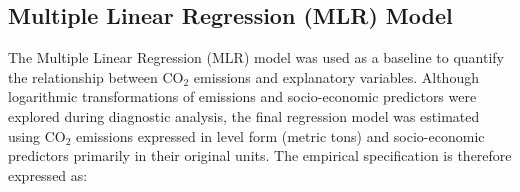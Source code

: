 \documentclass[10pt,letterpaper]{article}
\begin{document}
%
%




\subsection{Multiple Linear Regression (MLR) Model}
\label{sec:mlr_model}


The Multiple Linear Regression (MLR) model was used as a baseline to quantify the relationship between CO$_2$ emissions and explanatory variables\cite{shams2021evaluation}. Although logarithmic transformations of emissions and socio-economic predictors were explored during diagnostic analysis, the final regression model was estimated using CO$_2$ emissions expressed in level form (metric tons) and socio-economic predictors primarily in their original units. The empirical specification is therefore expressed as:
\end{document}
